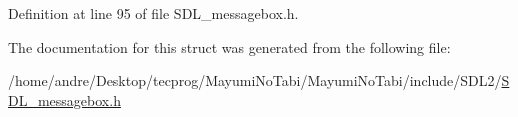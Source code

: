 Definition at line 95 of file S\-D\-L\-\_\-messagebox.\-h.



The documentation for this struct was generated from the following file\-:\begin{DoxyCompactItemize}
\item 
/home/andre/\-Desktop/tecprog/\-Mayumi\-No\-Tabi/\-Mayumi\-No\-Tabi/include/\-S\-D\-L2/\hyperlink{_s_d_l__messagebox_8h}{S\-D\-L\-\_\-messagebox.\-h}\end{DoxyCompactItemize}
